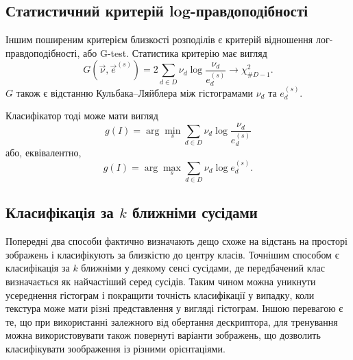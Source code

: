 \subsection{Статистичний критерій log-правдоподібності}\label{section1.3b}\hfill

Іншим поширеним критерієм близкості розподілів є критерій відношення лог-правдоподібності, або G-test.
Статистика критерію має вигляд%
\begin{equation*}\label{e:gtest-1}
    G(\vec \nu,\vec e^{(s)}) = 2\sum_{d \in D} \nu_d \log \frac{\nu_d}{e^{(s)}_d} \longrightarrow \chi^2_{\# D - 1}.
\end{equation*}
$G$ також є відстанню Кульбака--Ляйблера між гістограмами $\nu_d$ та $e^{(s)}_d$. 


Класифікатор тоді може мати вигляд
\begin{equation}\label{e:gtest-classifier-1}
    g(I) = \arg \min_s  \sum_{d \in D} \nu_d \log \frac{\nu_d}{e^{(s)}_d}
\end{equation}
або, еквівалентно,\begin{equation*}\label{e:gtest-classifier-2}
    g(I) = \arg \max_s  \sum_{d \in D} \nu_d \log e^{(s)}_d.
\end{equation*}

\subsection{Класифікація за $k$ ближніми сусідами}\label{section1.3c}

Попередні два способи фактично визначають дещо схоже на відстань на просторі зображень і класифікують за близкістю до центру класів.
Точнішим способом є класифікація за $k$ ближніми у деякому сенсі сусідами, де передбачений клас визначається як найчастіший серед сусідів.
Таким чином можна уникнути усереднення гістограм і покращити точність класифікації у випадку, коли текстура може мати різні представлення у вигляді гістограм.
Іншою перевагою є те, що при використанні залежного від обертання дескриптора, для тренування можна використовувати також повернуті варіанти зображень, що дозволить класифікувати зоображення із різними орієнтаціями.



